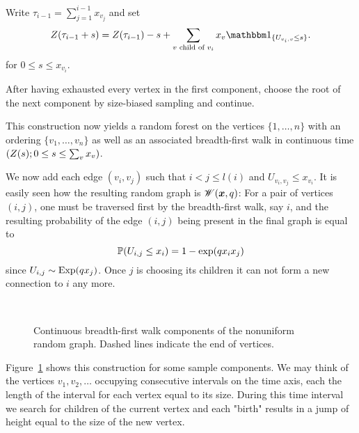 Write $\tau_{i-1} = \sum_{j = 1}^{i-1} x_{v_j}$ and set
\begin{equation}
	\bfw(\tau_{i-1} + s) = \bfw(\tau_{i-1}) - s + \sum_{\text{$v$ child of $v_i$}} x_v \Ind{\{U_{v_i, v} \leq s\}}.
\end{equation}
for $0 \leq s \leq x_{v_i}$.

After having exhausted every vertex in the first component, 
choose the root of the next component by size-biased sampling and continue.

This construction now yields a random forest on the vertices $\{1,  \dots, n\}$
with an ordering $\{v_1, \dots, v_n\}$ 
as well as an associated breadth-first walk in continuous time $(Z(s); 0 \leq s \leq \sum_vx_v)$.

We now add each edge $(v_i, v_j)$ such that $i < j \leq l(i)$ and $U_{v_i, v_j} \leq x_{v_i}$.
It is easily seen how the resulting random graph is $\mathscr{W}(\boldsymbol{x}, q)$:
For a pair of vertices $(i, j)$, one must be traversed first by the breadth-first walk, say $i$,
and the resulting probability of the edge $(i,j)$ being present in the final graph is equal to
\begin{equation}
	\mathbb{P}(U_{i,j} \leq x_i ) = 1 - \exp(q x_i x_j)
\end{equation}
since $U_{i,j} \sim \operatorname*{Exp}(qx_j)$.
Once $j$ is choosing its children it can not form a new connection to $i$ any more.

\begin{figure}[H]
	\centering
	\\
	
	\centering
	
	\caption{Continuous breadth-first walk components of the nonuniform random graph. Dashed lines indicate the end of vertices.}
	\label{F: nonu bf-walk}
\end{figure} 

Figure~\ref{F: nonu bf-walk} shows this construction for some sample components. 
We may think of the vertices $v_1, v_2, \dots$ occupying consecutive intervals on the time axis,
each the length of the interval for each vertex equal to its size.
During this time interval we search for children of the current vertex 
and each "birth" results in a jump of height equal to the size of the new vertex.


